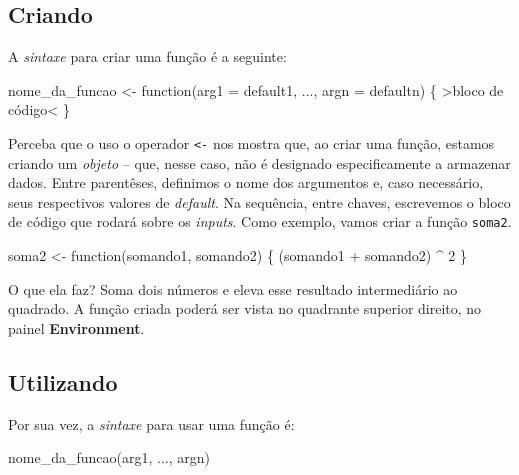 \documentclass[
  letterpaper,
  DIV=11,
  numbers=noendperiod]{scrreprt}
\newenvironment{Shaded}{\begin{snugshade}}{\end{snugshade}}
\newcommand{\AttributeTok}[1]{\textcolor[rgb]{0.40,0.45,0.13}{#1}}
\newcommand{\ControlFlowTok}[1]{\textcolor[rgb]{0.00,0.23,0.31}{#1}}
\newcommand{\DecValTok}[1]{\textcolor[rgb]{0.68,0.00,0.00}{#1}}
\newcommand{\FunctionTok}[1]{\textcolor[rgb]{0.28,0.35,0.67}{#1}}
\newcommand{\NormalTok}[1]{\textcolor[rgb]{0.00,0.23,0.31}{#1}}
\newcommand{\OtherTok}[1]{\textcolor[rgb]{0.00,0.23,0.31}{#1}}
\newcommand{\SpecialCharTok}[1]{\textcolor[rgb]{0.37,0.37,0.37}{#1}}
\begin{document}
\subsection{Criando}\label{criando}

A \emph{sintaxe} para criar uma função é a seguinte:

\begin{Shaded}
\begin{Highlighting}[]
\NormalTok{nome\_da\_funcao }\OtherTok{\textless{}{-}} \ControlFlowTok{function}\NormalTok{(}\AttributeTok{arg1 =}\NormalTok{ default1, ..., }\AttributeTok{argn =}\NormalTok{ defaultn) \{}
  \SpecialCharTok{\textgreater{}}\NormalTok{bloco de código}\SpecialCharTok{\textless{}}
\NormalTok{\}}
\end{Highlighting}
\end{Shaded}

Perceba que o uso o operador \texttt{\textless{}-} nos mostra que, ao
criar uma função, estamos criando um \emph{objeto} -- que, nesse caso,
não é designado especificamente a armazenar dados. Entre parentêses,
definimos o nome dos argumentos e, caso necessário, seus respectivos
valores de \emph{default}. Na sequência, entre chaves, escrevemos o
bloco de código que rodará sobre os \emph{inputs}. Como exemplo, vamos
criar a função \texttt{soma2}.

\begin{Shaded}
\begin{Highlighting}[]
\NormalTok{soma2 }\OtherTok{\textless{}{-}} \ControlFlowTok{function}\NormalTok{(somando1, somando2) \{}
\NormalTok{  (somando1 }\SpecialCharTok{+}\NormalTok{ somando2) }\SpecialCharTok{\^{}} \DecValTok{2}
\NormalTok{\}}
\end{Highlighting}
\end{Shaded}

O que ela faz? Soma dois números e eleva esse resultado intermediário ao
quadrado. A função criada poderá ser vista no quadrante superior
direito, no painel \textbf{Environment}.

\subsection{Utilizando}\label{utilizando}

Por sua vez, a \emph{sintaxe} para usar uma função é:

\begin{Shaded}
\begin{Highlighting}[]
\FunctionTok{nome\_da\_funcao}\NormalTok{(arg1, ..., argn)}
\end{Highlighting}
\end{Shaded}
\end{document}
